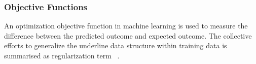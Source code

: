 \subsubsection{Objective Functions}
An optimization objective function in machine learning is used to measure the difference between the predicted outcome and expected outcome. The collective efforts to generalize the underline data structure within training data is summarised as regularization term ~\cite{goodfellow_2015}.  